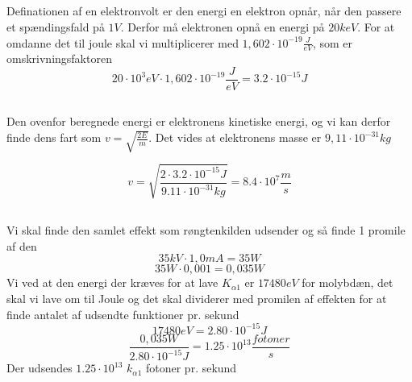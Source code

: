 \documentclass[a4paper,twoside]{article}
\begin{document}
\subsection{}
Definationen af en elektronvolt er den energi en elektron opnår, når den passere et spændingsfald på $1V$. Derfor må elektronen opnå en energi på $20keV$. For at omdanne det til joule skal vi multiplicerer med $1,602\cdot10^{-19} \frac{J}{eV}$, som er omskrivningsfaktoren
\begin{equation*}
20\cdot10^3 eV \cdot1,602\cdot10^{-19} \frac{J}{eV}=3.2\cdot10^{-15} J
\end {equation*}

\subsection{}
Den ovenfor beregnede energi er elektronens kinetiske energi, og vi kan derfor finde dens fart som $v=\sqrt{\frac{2E}{m}}$.
Det vides at elektronens masse er $9,11\cdot10^{-31} kg$

\begin {equation*}
v=\sqrt{\frac{2\cdot3.2\cdot10^{-15}J}{9.11\cdot10^{-31}kg}}=8.4\cdot10^7 \frac{m}{s}
\end{equation*}
\subsection{}
Vi skal finde den samlet effekt som røngtenkilden udsender og så finde 1 promile af den 
\begin{equation*}
35kV\cdot1,0mA=35W
\end{equation*}
\begin{equation*}
    35W\cdot0,001=0,035W
\end{equation*}
Vi ved at den energi der kræves for at lave $K_{\alpha1}$ er $17480eV$ for molybdæn, det skal vi lave om til Joule og det skal dividerer med promilen af effekten for at finde antalet af udsendte funktioner pr. sekund
\begin{equation}
    17480eV=2.80\cdot10^{-15}J
\end{equation}
\begin{equation*}
     \frac{0,035W}{2.80\cdot10^{-15}J}=1.25\cdot10^{13}\frac{fotoner}{s} 
\end{equation*}
Der udsendes $1.25\cdot10^{13}$ $k_{\alpha1}$ fotoner pr. sekund
\end{document}

